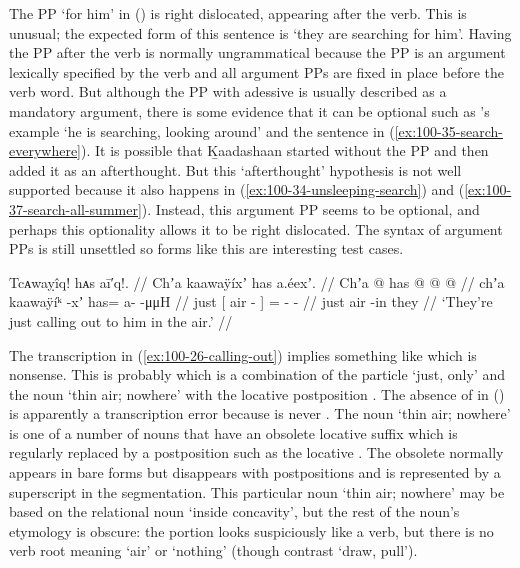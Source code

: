 The PP  ‘for him’ in (\nextx) is right dislocated, appearing after the verb.
This is unusual; the expected form of this sentence is  ‘they are searching for him’.
Having the PP after the verb is normally ungrammatical because the PP is an argument lexically specified by the verb and all argument PPs are fixed in place before the verb word.  But although the PP with adessive  is usually described as a mandatory argument, there is some evidence that it can be optional such as \citeauthor{leer:1973}’s example  ‘he is searching, looking around’ \parencite[10/64]{leer:1973} and the sentence in (\ref{ex:100-35-search-everywhere}).
It is possible that Ḵaadashaan started without the PP and then added it as an afterthought.
But this ‘afterthought’ hypothesis is not well supported because it also happens in (\ref{ex:100-34-unsleeping-search}) and (\ref{ex:100-37-search-all-summer}).
Instead, this argument PP seems to be optional, and perhaps this optionality allows it to be right dislocated.
The syntax of argument PPs is still unsettled so forms like this are interesting test cases.

\ex\label{ex:100-26-calling-out}%
%
\begingl
	\glpreamble	Tcᴀwaỵîq! hᴀs aī′q!. //
	\glpreamble	Chʼa kaawaÿíxʼ has a.éexʼ. //
	\gla	Chʼa {}  @ {} {}
		has @  @ {} @ {} //
	\glb	chʼa {} kaawaÿíᵏ -xʼ {}
		has= a-  -μμH //
	\glc	just {}[ air - {}]
		= -  - //
	\gld	just {} air -in {}
		they  {} {} //
	\glft	‘They’re just calling out to him in the air.’
		//
\endgl
\xe

The transcription  in (\ref{ex:100-26-calling-out}) implies something like  which is nonsense.
This is probably  which is a combination of the particle  ‘just, only’ and the noun  ‘thin air; nowhere’ with the locative postposition .
The absence of  in (\lastx) is apparently a transcription error because  is never .
The noun  ‘thin air; nowhere’ is one of a number of nouns that have an obsolete locative suffix  which is regularly replaced by a postposition such as the locative .
The obsolete  normally appears in bare forms but disappears with postpositions and is represented by a superscript  in the segmentation.
This particular noun  ‘thin air; nowhere’ may be based on the relational noun  ‘inside concavity’, but the rest of the noun’s etymology is obscure: the  portion looks suspiciously like a verb, but there is no verb root  meaning ‘air’ or ‘nothing’ (though contrast  ‘draw, pull’).

